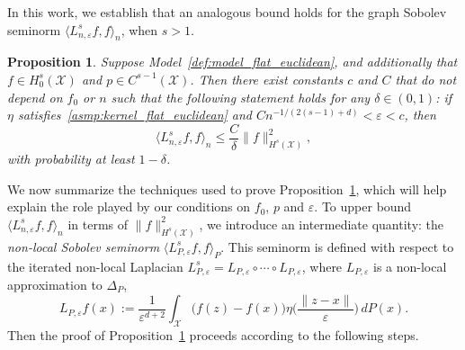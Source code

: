 \documentclass[aos]{imsart}
\theoremstyle{plain}
\newtheorem{proposition}{Proposition}
\theoremstyle{definition}
\theoremstyle{remark}
\newcommand{\dotp}[2]{\langle #1, #2 \rangle}
\newcommand{\mc}[1]{\mathcal{#1}}
\newcommand{\1}{\mathbf{1}}
\begin{document}
In this work, we establish that an analogous bound holds for the graph Sobolev seminorm $\dotp{L_{n,\varepsilon}^sf}{f}_n$, when $s > 1$.
\begin{proposition}
	\label{prop:graph_seminorm_ho} 
	Suppose Model~\ref{def:model_flat_euclidean}, and additionally that $f \in H_0^s(\mc{X})$ and $p \in C^{s - 1}(\mc{X})$. Then there exist constants $c$ and $C$ that do not depend on $f_0$ or $n$ such that the following statement holds for any $\delta \in (0,1)$: if $\eta$ satisfies~\ref{asmp:kernel_flat_euclidean} and $Cn^{-1/(2(s - 1) + d)} < \varepsilon < c$, then
	\begin{equation}
	\label{eqn:graph_seminorm_ho}
	\dotp{L_{n,\varepsilon}^s f}{f}_n \leq \frac{C}{\delta} \|f\|_{H^s(\mc{X})}^2 ,
	\end{equation}
	with probability at least $1 - \delta$.
\end{proposition}
We now summarize the techniques used to prove Proposition~\ref{prop:graph_seminorm_ho}, which will help explain the role played by our conditions on $f_0$, $p$ and $\varepsilon$. To upper bound $\dotp{L_{n,\varepsilon}^sf}{f}_n$ in terms of $\|f\|_{H^s(\mc{X})}^2$, we introduce an intermediate quantity: the \emph{non-local Sobolev seminorm} $\dotp{L_{P,\varepsilon}^sf}{f}_{P}$. This seminorm is defined with respect to the iterated non-local Laplacian $L_{P,\varepsilon}^s = L_{P,\varepsilon} \circ \cdots \circ L_{P,\varepsilon}$, where $L_{P,\varepsilon}$ is a non-local approximation to $\Delta_P$, 
\begin{equation}
\label{eqn:nonlocal_laplacian}
L_{P,\varepsilon}f(x) := \frac{1}{\varepsilon^{d + 2}}\int_{\mc{X}}\bigl(f(z) - f(x)\bigr) \eta\biggl(\frac{\|z - x\|}{\varepsilon}\biggr) \,dP(x).
\end{equation}
Then the proof of Proposition~\ref{prop:graph_seminorm_ho} proceeds according to the following steps.
\end{document}
